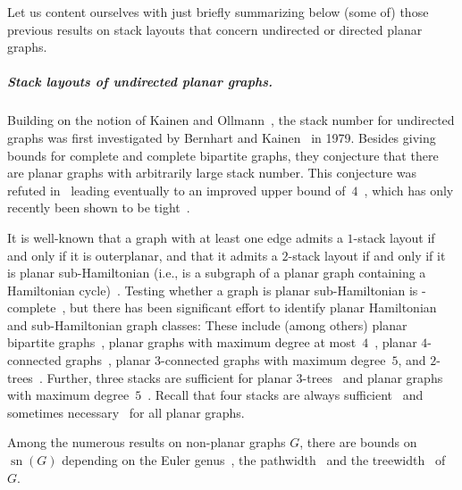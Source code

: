 \documentclass{article}
\DeclareMathOperator{\sn}{sn}
\begin{document}
Let us content ourselves with just briefly summarizing below (some of) those previous results on stack layouts that concern undirected or directed planar graphs.



\subparagraph{Stack layouts of undirected planar graphs.}
Building on the notion of Kainen and Ollmann~\cite{Kainen1974_BookThickness,Ollmann1973_BookThickness}, the stack number for undirected graphs was first investigated by Bernhart and Kainen~\cite{Bernhart1979_BookThickness} in 1979.
Besides giving bounds for complete and complete bipartite graphs, they conjecture that there are planar graphs with arbitrarily large stack number.
This conjecture was refuted in~\cite{Buss1984_StacksPlanar,Heath1984_7StacksPlanar} leading eventually to an improved upper bound of~$4$~\cite{Yannakakis1989_4StacksPlanar}, which has only recently been shown to be tight~\cite{Bekos2020_4StacksPlanar,Yannakakis2020_4StacksPlanar}.

It is well-known that a graph with at least one edge admits a $1$-stack layout if and only if it is outerplanar, and that it admits a $2$-stack layout if and only if it is planar sub-Hamiltonian (i.e., is a subgraph of a planar graph containing a Hamiltonian cycle)~\cite{Bernhart1979_BookThickness}.
Testing whether a graph is planar sub-Hamiltonian is \NP-complete~\cite{Wigderson1982_HamiltonianCompletion}, but there has been significant effort to identify planar Hamiltonian and sub-Hamiltonian graph classes:
These include (among others) planar bipartite graphs~\cite{DeFraysseix1995_PlanarBipartite}, planar graphs with maximum degree at most~$4$~\cite{Bekos2016_Deg4Hamiltonian}, planar $4$-connected graphs~\cite{Tutte1956_4ConnectedHamiltonian}, planar $3$-connected graphs with maximum degree~$5$, and $2$-trees~\cite{Rengarajan1995_Stacks2Trees}.
Further, three stacks are sufficient for planar $3$-trees~\cite{Heath1984_7StacksPlanar} and planar graphs with maximum degree~$5$~\cite{Guan2020_Deg5Planar}.
Recall that four stacks are always sufficient~\cite{Yannakakis1989_4StacksPlanar} and sometimes necessary~\cite{Bekos2020_4StacksPlanar,Yannakakis2020_4StacksPlanar} for all planar graphs.

Among the numerous results on non-planar graphs $G$, there are bounds on $\sn(G)$ depending on the Euler genus~\cite{Malitz1994_EulerGenus}, the pathwidth~\cite{Togasaki2002_Pathwidth} and the treewidth~\cite{Ganley2001_Treewidth,Dujmovic2007_treewidth,Vandenbussche2009_kTrees} of $G$.
\end{document}
